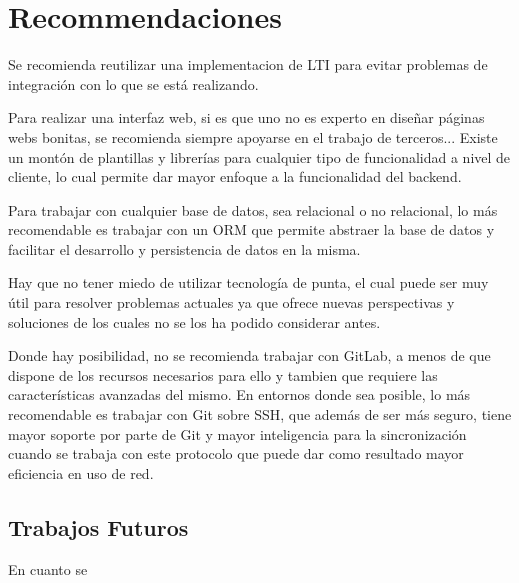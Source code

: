 
\chapter{Recommendaciones}
\label{capitulo8}

Se recomienda reutilizar una implementacion de LTI para evitar problemas de integración con lo que se está realizando.

Para realizar una interfaz web, si es que uno no es experto en diseñar páginas webs bonitas, se recomienda siempre apoyarse en el trabajo de terceros... Existe un montón de plantillas y librerías para cualquier tipo de funcionalidad a nivel de cliente, lo cual permite dar mayor enfoque a la funcionalidad del backend.

Para trabajar con cualquier base de datos, sea relacional o no relacional, lo más recomendable es trabajar con un ORM que permite abstraer la base de datos y facilitar el desarrollo y persistencia de datos en la misma.

Hay que no tener miedo de utilizar tecnología de punta, el cual puede ser muy útil para resolver problemas actuales ya que ofrece nuevas perspectivas y soluciones de los cuales no se los ha podido considerar antes.

Donde hay posibilidad, no se recomienda trabajar con GitLab, a menos de que dispone de los recursos necesarios para ello y tambien que requiere las características avanzadas del mismo. En entornos donde sea posible, lo más recomendable es trabajar con Git sobre SSH, que además de ser más seguro, tiene mayor soporte por parte de Git y mayor inteligencia para la sincronización cuando se trabaja con este protocolo que puede dar como resultado mayor eficiencia en uso de red.


\section{Trabajos Futuros}
En cuanto se 

